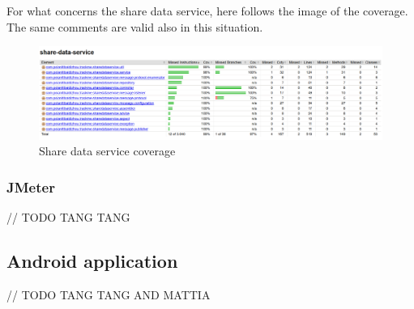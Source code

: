 \par
For what concerns the share data service, here follows the image of the coverage. The same comments
are valid also in this situation.

\begin{figure}[H]
\includegraphics[width=\linewidth]{images/CoverageSharedataservice.png}
\caption{ Share data service coverage}
\label{fig:cvgshare}
\end{figure}


\subsubsection{JMeter} 
// TODO TANG TANG


\subsection{Android application}
// TODO TANG TANG AND MATTIA 
